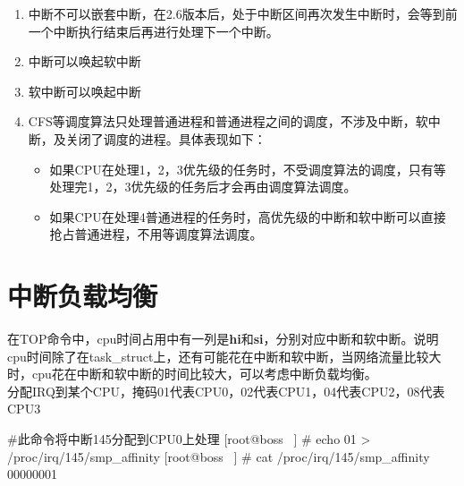 \begin{enumerate}
  \item 中断不可以嵌套中断，在2.6版本后，处于中断区间再次发生中断时，会等到前一个中断执行结束后再进行处理下一个中断。
  \item 中断可以唤起软中断
  \item 软中断可以唤起中断
  \item CFS等调度算法只处理普通进程和普通进程之间的调度，不涉及中断，软中断，及关闭了调度的进程。具体表现如下：\begin{itemize}
        \item 如果CPU在处理1，2，3优先级的任务时，不受调度算法的调度，只有等处理完1，2，3优先级的任务后才会再由调度算法调度。
        \item 如果CPU在处理4普通进程的任务时，高优先级的中断和软中断可以直接抢占普通进程，不用等调度算法调度。
        \end{itemize}
\end{enumerate}
\section{中断负载均衡}
在TOP命令中，cpu时间占用中有一列是\textbf{hi}和\textbf{si}，分别对应中断和软中断。说明cpu时间除了在task\_struct上，还有可能花在中断和软中断，当网络流量比较大时，cpu花在中断和软中断的时间比较大，可以考虑中断负载均衡。\\

分配IRQ到某个CPU，掩码01代表CPU0，02代表CPU1，04代表CPU2，08代表CPU3



\begin{latexcmd}[label= 中断分配到CPU方法]
#此命令将中断145分配到CPU0上处理
[root@boss ~] # echo 01 > /proc/irq/145/smp_affinity
[root@boss ~] # cat /proc/irq/145/smp_affinity
			00000001
\end{latexcmd}
